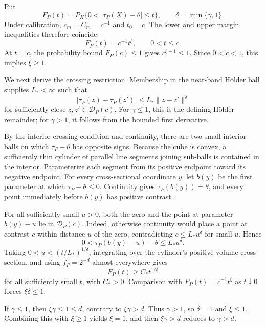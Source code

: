 Put
\[
F_P(t)=P_X\{0<|\tau_P(X)-\theta|\le t\},
\qquad
\delta=\min\{\gamma,1\}.
\]
Under calibration, \(c_m=C_m=c^{-1}\) and \(t_0=c\). The lower and upper margin inequalities therefore coincide:
\[
F_P(t)=c^{-1}t^\xi,
\qquad 0<t\le c.
\]
At \(t=c\), the probability bound \(F_P(c)\le1\) gives \(c^{\xi-1}\le1\). Since \(0<c<1\), this implies \(\xi\ge1\).

We next derive the crossing restriction. Membership in the near-band Hölder ball supplies \(L_*<\infty\) such that
\[
|\tau_P(z)-\tau_P(z')|\le L_*\|z-z'\|^\delta
\]
for sufficiently close \(z,z'\in\mathcal D_P(c)\). For \(\gamma\le1\), this is the defining Hölder remainder; for \(\gamma>1\), it follows from the bounded first derivative.

By the interior-crossing condition and continuity, there are two small interior balls on which \(\tau_P-\theta\) has opposite signs. Because the cube is convex, a sufficiently thin cylinder of parallel line segments joining sub-balls is contained in the interior. Parameterize each segment from its positive endpoint toward its negative endpoint. For every cross-sectional coordinate \(y\), let \(b(y)\) be the first parameter at which \(\tau_P-\theta\le0\). Continuity gives \(\tau_P(b(y))=\theta\), and every point immediately before \(b(y)\) has positive contrast.

For all sufficiently small \(u>0\), both the zero and the point at parameter \(b(y)-u\) lie in \(\mathcal D_P(c)\). Indeed, otherwise continuity would place a point at contrast \(c\) within distance \(u\) of the zero, contradicting \(c\le L_*u^\delta\) for small \(u\). Hence
\[
0<\tau_P(b(y)-u)-\theta\le L_*u^\delta.
\]
Taking \(0<u<(t/L_*)^{1/\delta}\), integrating over the cylinder's positive-volume cross-section, and using \(f_P=2^{-d}\) almost everywhere gives
\[
F_P(t)\ge C_*t^{1/\delta}
\]
for all sufficiently small \(t\), with \(C_*>0\). Comparison with \(F_P(t)=c^{-1}t^\xi\) as \(t\downarrow0\) forces \(\xi\delta\le1\).

If \(\gamma\le1\), then \(\xi\gamma\le1\le d\), contrary to \(\xi\gamma>d\). Thus \(\gamma>1\), so \(\delta=1\) and \(\xi\le1\). Combining this with \(\xi\ge1\) yields \(\xi=1\), and then \(\xi\gamma>d\) reduces to \(\gamma>d\).
